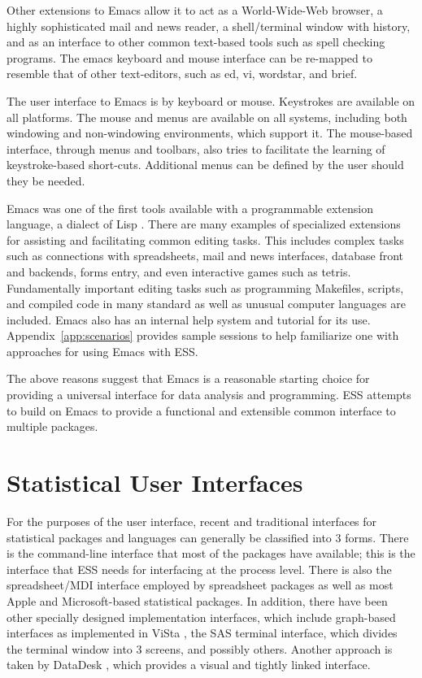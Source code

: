 \documentclass{article}
\begin{document}
Other extensions to Emacs allow it to act as a World-Wide-Web browser,
a highly sophisticated mail and news reader, a shell/terminal window
with history, and as an interface to other common text-based tools
such as spell checking programs.  The emacs keyboard and mouse
interface can be re-mapped to resemble that of other text-editors,
such as ed, vi, wordstar, and brief.

The user interface to Emacs is by keyboard or mouse.  Keystrokes are
available on all platforms.  The mouse and menus are available on all
systems, including both windowing and non-windowing environments,
which support it.  The mouse-based interface, through menus and
toolbars, also tries to facilitate the learning of keystroke-based
short-cuts.  Additional menus can be defined by the user should they
be needed.

Emacs was one of the first tools available with a programmable
extension language, a dialect of Lisp
\citep{RChassell1999,PGraham:1996}.  There are many examples of
specialized extensions for assisting and facilitating common editing
tasks.  This includes complex tasks such as connections with
spreadsheets, mail and news interfaces, database front and backends,
forms entry, and even interactive games such as tetris.  Fundamentally
important editing tasks such as programming Makefiles, scripts, and
compiled code in many standard as well as unusual computer languages
are included.  Emacs also has an internal help system and tutorial for
its use.  Appendix~\ref{app:scenarios} provides sample sessions to
help familiarize one with approaches for using Emacs with ESS.

The above reasons suggest that Emacs is a reasonable starting choice
for providing a universal interface for data analysis and programming.
ESS attempts to build on Emacs to provide a functional and extensible
common interface to multiple packages.

\section{Statistical User Interfaces}
\label{sec:UI}

For the purposes of the user interface, recent and traditional
interfaces for statistical packages and languages can generally be
classified into 3 forms.  There is the command-line interface that
most of the packages have available; this is the interface that ESS
needs for interfacing at the process level.  There is also the
spreadsheet/MDI interface employed by spreadsheet packages as well as
most Apple and Microsoft-based statistical packages.  In addition,
there have been other specially designed implementation interfaces,
which include graph-based interfaces as implemented in ViSta
\citep{youn:lubi:1995}, the SAS terminal interface, which divides the
terminal window into 3 screens, and possibly others.  Another approach
is taken by DataDesk \citep{vell:prat:1989}, which provides a visual
and tightly linked interface.
\end{document}
